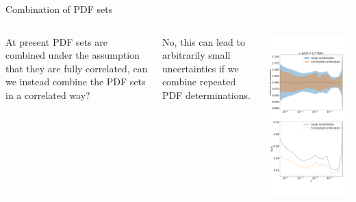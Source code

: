 \begin{frame}{Combination of PDF sets}
    	\begin{columns}[t]

			At present PDF sets are combined under the assumption that they are fully correlated, can we instead combine the PDF sets in a correlated way?

        	\vspace{0.2cm}
			No, this can lead to arbitrarily small uncertainties if we combine repeated PDF determinations.

       	\vspace{-2.7cm}
       	\begin{center}
       		\includegraphics[height=1.15\textheight]{roy_pdf_correlations/ratio_2.pdf}
       	\end{center}
			
    	\end{columns}
\end{frame}
